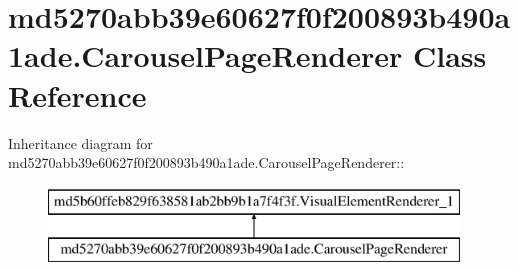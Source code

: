 \hypertarget{classmd5270abb39e60627f0f200893b490a1ade_1_1_carousel_page_renderer}{
\section{md5270abb39e60627f0f200893b490a1ade.CarouselPageRenderer Class Reference}
\label{classmd5270abb39e60627f0f200893b490a1ade_1_1_carousel_page_renderer}
}
Inheritance diagram for md5270abb39e60627f0f200893b490a1ade.CarouselPageRenderer::\begin{figure}[H]
\begin{center}
\leavevmode
\includegraphics[height=2cm]{classmd5270abb39e60627f0f200893b490a1ade_1_1_carousel_page_renderer}
\end{center}
\end{figure}
